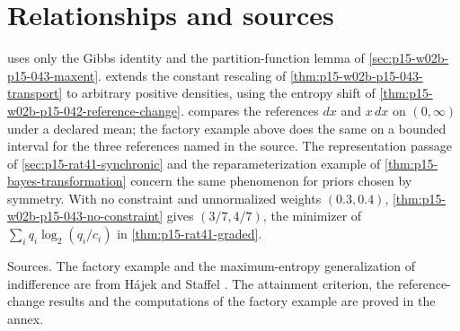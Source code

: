 \section{Relationships and sources}
\label{sec:p15-w02b-p15-044-relations}

 uses only the Gibbs identity and
the partition-function lemma of \cref{sec:p15-w02b-p15-043-maxent}.
 extends the constant rescaling of
\cref{thm:p15-w02b-p15-043-transport} to arbitrary positive densities,
using the entropy shift of \cref{thm:p15-w02b-p15-042-reference-change}.
 compares the references
\(dx\) and \(x\,dx\) on \((0,\infty)\) under a declared mean; the factory
example above does the same on a bounded interval for the three references
named in the source. The representation passage of
\cref{sec:p15-rat41-synchronic} and the reparameterization example of
\cref{thm:p15-bayes-transformation} concern the same phenomenon for priors
chosen by symmetry. With no constraint and unnormalized weights
\((0.3,0.4)\), \cref{thm:p15-w02b-p15-043-no-constraint} gives
\((3/7,4/7)\), the minimizer of \(\sum_iq_i\log_2(q_i/c_i)\) in
\cref{thm:p15-rat41-graded}.

Sources. The factory example and the maximum-entropy generalization of
indifference are from H\'ajek and Staffel
\cite[p.~244]{HajekStaffel2021Dynamics}. The attainment criterion, the
reference-change results and the computations of the factory example are
proved in the annex.
